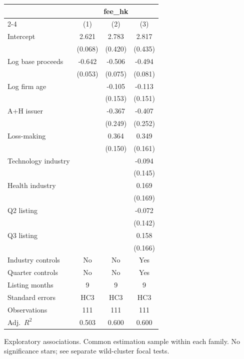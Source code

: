 \begin{table}[!htbp]\centering
\begin{tabular}{lccc}
\toprule
 & \multicolumn{3}{c}{fee\_hk} \\
\cmidrule(lr){2-4}
 & (1) & (2) & (3) \\
\midrule
Intercept & 2.621 & 2.783 & 2.817 \\
 & (0.068) & (0.420) & (0.435) \\
Log base proceeds & -0.642 & -0.506 & -0.494 \\
 & (0.053) & (0.075) & (0.081) \\
Log firm age &  & -0.105 & -0.113 \\
 &  & (0.153) & (0.151) \\
A+H issuer &  & -0.367 & -0.407 \\
 &  & (0.249) & (0.252) \\
Loss-making &  & 0.364 & 0.349 \\
 &  & (0.150) & (0.161) \\
Technology industry &  &  & -0.094 \\
 &  &  & (0.145) \\
Health industry &  &  & 0.169 \\
 &  &  & (0.169) \\
Q2 listing &  &  & -0.072 \\
 &  &  & (0.142) \\
Q3 listing &  &  & 0.158 \\
 &  &  & (0.166) \\
\midrule
Industry controls & No & No & Yes \\
Quarter controls & No & No & Yes \\
Listing months & 9 & 9 & 9 \\
Standard errors & HC3 & HC3 & HC3 \\
Observations & 111 & 111 & 111 \\
Adj.\ $R^2$ & 0.503 & 0.600 & 0.600 \\
\bottomrule
\end{tabular}
\par\vspace{2pt}\begin{minipage}{0.95\linewidth}\footnotesize Exploratory associations. Common estimation sample within each family. No significance stars; see separate wild-cluster focal tests.\end{minipage}
\end{table}